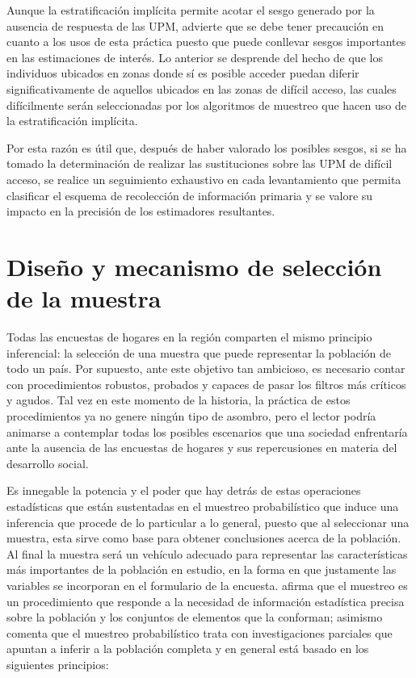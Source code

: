 \documentclass[
  12pt,
  spanish,
]{book}
\begin{document}
Aunque la estratificación implícita permite acotar el sesgo generado por la ausencia de respuesta de las UPM, \citet[págs. 348 - 349]{Vehovar_1999} advierte que se debe tener precaución en cuanto a los usos de esta práctica puesto que puede conllevar sesgos importantes en las estimaciones de interés. Lo anterior se desprende del hecho de que los individuos ubicados en zonas donde sí es posible acceder puedan diferir significativamente de aquellos ubicados en las zonas de difícil acceso, las cuales difícilmente serán seleccionadas por los algoritmos de muestreo que hacen uso de la estratificación implícita.

Por esta razón es útil que, después de haber valorado los posibles sesgos, si se ha tomado la determinación de realizar las sustituciones sobre las UPM de difícil acceso, se realice un seguimiento exhaustivo en cada levantamiento que permita clasificar el esquema de recolección de información primaria y se valore su impacto en la precisión de los estimadores resultantes.

\hypertarget{diseuxf1o-y-mecanismo-de-selecciuxf3n-de-la-muestra}{%
\chapter{Diseño y mecanismo de selección de la muestra}\label{diseuxf1o-y-mecanismo-de-selecciuxf3n-de-la-muestra}}

Todas las encuestas de hogares en la región comparten el mismo principio inferencial: la selección de una muestra que puede representar la población de todo un país. Por supuesto, ante este objetivo tan ambicioso, es necesario contar con procedimientos robustos, probados y capaces de pasar los filtros más críticos y agudos. Tal vez en este momento de la historia, la práctica de estos procedimientos ya no genere ningún tipo de asombro, pero el lector podría animarse a contemplar todas los posibles escenarios que una sociedad enfrentaría ante la ausencia de las encuestas de hogares y sus repercusiones en materia del desarrollo social.

Es innegable la potencia y el poder que hay detrás de estas operaciones estadísticas que están sustentadas en el muestreo probabilístico que induce una inferencia que procede de lo particular a lo general, puesto que al seleccionar una muestra, esta sirve como base para obtener conclusiones acerca de la población. Al final la muestra será un vehículo adecuado para representar las características más importantes de la población en estudio, en la forma en que justamente las variables se incorporan en el formulario de la encuesta. \citet{Gutierrez_2016} afirma que el muestreo es un procedimiento que responde a la necesidad de información estadística precisa sobre la población y los conjuntos de elementos que la conforman; asimismo comenta que el muestreo probabilístico trata con investigaciones parciales que apuntan a inferir a la población completa y en general está basado en los siguientes principios:
\end{document}
